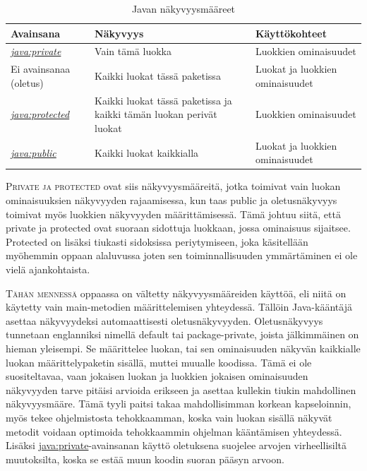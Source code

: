 \documentclass[openany]{book}
\newcommand{\newthought}[1]{\smallskip\textsc{#1}}
\newcommand{\java}[1]{\underline{\gls{java:#1}}}
\newcommand{\newjava}[1]{\textit{\java{#1}}}
\begin{document}
\bigskip
\begin{table}
\begin{center}
\footnotesize
\begin{tabular}{lll}
\toprule
Avainsana & Näkyvyys & Käyttökohteet \\
\midrule
\newjava{private} & Vain tämä luokka & Luokkien ominaisuudet \\
\addlinespace
Ei avainsanaa (oletus) & Kaikki luokat tässä paketissa & Luokat ja luokkien ominaisuudet \\
\addlinespace
\newjava{protected} & Kaikki luokat tässä paketissa ja kaikki tämän luokan perivät luokat &
Luokkien ominaisuudet \\
\addlinespace
\newjava{public} & Kaikki luokat kaikkialla & Luokat ja luokkien ominaisuudet \\
\bottomrule
\end{tabular}
\end{center}
\caption{Javan näkyvyysmääreet}
\label{accessmodifiers}
\end{table}

\newthought{Private ja protected} ovat siis näkyvyysmääreitä, jotka toimivat vain luokan
ominaisuuksien näkyvyyden rajaamisessa, kun taas public ja oletusnäkyvyys toimivat myös luokkien
näkyvyyden määrittämisessä. Tämä johtuu siitä, että private ja protected ovat suoraan sidottuja
luokkaan, jossa ominaisuus sijaitsee. Protected on lisäksi tiukasti sidoksissa periytymiseen, joka
käsitellään myöhemmin oppaan alaluvussa  joten sen toiminnallisuuden
ymmärtäminen ei ole vielä ajankohtaista.

\newthought{Tähän mennessä} oppaassa on vältetty näkyvyysmääreiden käyttöä, eli niitä on käytetty
vain main-metodien määrittelemisen yhteydessä. Tällöin Java-kääntäjä asettaa näkyvyydeksi
automaattisesti oletusnäkyvyyden. Oletusnäkyvyys tunnetaan englanniksi nimellä default tai
package-private, joista jälkimmäinen on hieman yleisempi. Se määrittelee luokan, tai sen
ominaisuuden näkyvän kaikkialle luokan määrittelypaketin sisällä, muttei muualle koodissa.
Tämä ei ole suositeltavaa, vaan jokaisen luokan ja luokkien jokaisen ominaisuuden näkyvyyden tarve
pitäisi arvioida erikseen ja asettaa kullekin tiukin mahdollinen näkyvyysmääre. Tämä tyyli paitsi
takaa mahdollisimman korkean kapseloinnin, myös tekee ohjelmistosta tehokkaamman, koska vain
luokan sisällä näkyvät metodit voidaan optimoida tehokkaammin ohjelman kääntämisen yhteydessä.
Lisäksi \java{private}-avainsanan käyttö oletuksena suojelee arvojen virheellisiltä muutoksilta,
koska se estää muun koodin suoran pääsyn arvoon.
\end{document}
